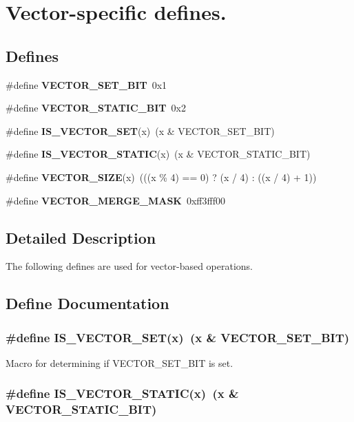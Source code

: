 \section{Vector-specific defines.}
\label{group__vector__defs}
\subsection*{Defines}
\begin{CompactItemize}
\item 
\#define {\bf VECTOR\_\-SET\_\-BIT}\ 0x1
\item 
\#define {\bf VECTOR\_\-STATIC\_\-BIT}\ 0x2
\item 
\#define {\bf IS\_\-VECTOR\_\-SET}(x)\ (x \& VECTOR\_\-SET\_\-BIT)
\item 
\#define {\bf IS\_\-VECTOR\_\-STATIC}(x)\ (x \& VECTOR\_\-STATIC\_\-BIT)
\item 
\#define {\bf VECTOR\_\-SIZE}(x)\ (((x \% 4) == 0) ? (x / 4) : ((x / 4) + 1))
\item 
\#define {\bf VECTOR\_\-MERGE\_\-MASK}\ 0xff3fff00
\end{CompactItemize}


\subsection{Detailed Description}
The following defines are used for vector-based operations. 

\subsection{Define Documentation}
\subsubsection{\setlength{\rightskip}{0pt plus 5cm}\#define IS\_\-VECTOR\_\-SET(x)\ (x \& VECTOR\_\-SET\_\-BIT)}\label{group__vector__defs_a2}


Macro for determining if VECTOR\_\-SET\_\-BIT is set. 
\subsubsection{\setlength{\rightskip}{0pt plus 5cm}\#define IS\_\-VECTOR\_\-STATIC(x)\ (x \& VECTOR\_\-STATIC\_\-BIT)}\label{group__vector__defs_a3}


